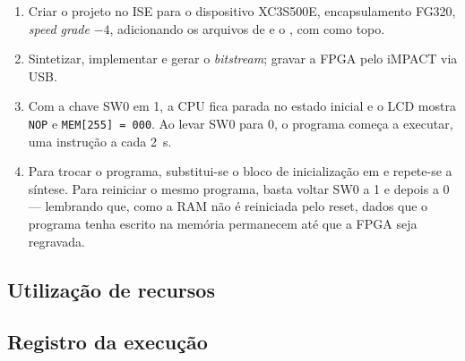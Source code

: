 \begin{enumerate}[nosep]
  \item Criar o projeto no ISE para o dispositivo XC3S500E, encapsulamento
        FG320, \emph{speed grade} $-4$, adicionando os arquivos de  e
        o , com  como topo.
  \item Sintetizar, implementar e gerar o \emph{bitstream}; gravar a FPGA pelo
        iMPACT via USB.
  \item Com a chave SW0 em 1, a CPU fica parada no estado inicial e o LCD
        mostra \texttt{NOP} e \texttt{MEM[255] = 000}. Ao levar SW0 para 0, o
        programa começa a executar, uma instrução a cada \SI{2}{\second}.
  \item Para trocar o programa, substitui-se o bloco de inicialização em
         e repete-se a síntese. Para reiniciar o mesmo programa,
        basta voltar SW0 a 1 e depois a 0 --- lembrando que, como a RAM não é
        reiniciada pelo reset, dados que o programa tenha escrito na memória
        permanecem até que a FPGA seja regravada.
\end{enumerate}

\subsection{Utilização de recursos}


\subsection{Registro da execução}


